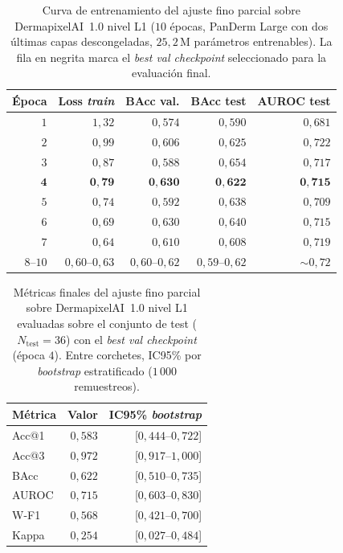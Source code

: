 \begin{table}[H]
\centering
\footnotesize
\setlength{\tabcolsep}{4pt}
\renewcommand{\arraystretch}{0.95}
\caption{Curva de entrenamiento del ajuste fino parcial sobre
DermapixelAI~1.0 nivel L1 ($10$ épocas, PanDerm Large con dos
últimas capas descongeladas, $25{,}2$\,M parámetros
entrenables). La fila en negrita marca el \emph{best val
checkpoint} seleccionado para la evaluación final.}
\label{tab:dermapixel-ft-train}
\begin{tabular}{rrrrr}
\hline
Época & Loss \emph{train} & BAcc val. & BAcc test & AUROC test \\
\hline
$1$  & $1{,}32$ & $0{,}574$ & $0{,}590$ & $0{,}681$ \\
$2$  & $0{,}99$ & $0{,}606$ & $0{,}625$ & $0{,}722$ \\
$3$  & $0{,}87$ & $0{,}588$ & $0{,}654$ & $0{,}717$ \\
$\mathbf{4}$  & $\mathbf{0{,}79}$ & $\mathbf{0{,}630}$ & $\mathbf{0{,}622}$ & $\mathbf{0{,}715}$ \\
$5$  & $0{,}74$ & $0{,}592$ & $0{,}638$ & $0{,}709$ \\
$6$  & $0{,}69$ & $0{,}630$ & $0{,}640$ & $0{,}715$ \\
$7$  & $0{,}64$ & $0{,}610$ & $0{,}608$ & $0{,}719$ \\
$8$--$10$ & $0{,}60$--$0{,}63$ & $0{,}60$--$0{,}62$ & $0{,}59$--$0{,}62$ & $\sim 0{,}72$ \\
\hline
\end{tabular}
\end{table}

\begin{table}[H]
\centering
\footnotesize
\setlength{\tabcolsep}{4pt}
\renewcommand{\arraystretch}{0.95}
\caption{Métricas finales del ajuste fino parcial sobre
DermapixelAI~1.0 nivel L1 evaluadas sobre el conjunto de test
($N_{\mathrm{test}} = 36$) con el \emph{best val checkpoint}
(época $4$). Entre corchetes, IC95\% por \emph{bootstrap}
estratificado ($1\,000$ remuestreos).}
\label{tab:dermapixel-ft-final}
\begin{tabular}{lrr}
\hline
Métrica   & Valor      & IC95\% \emph{bootstrap} \\
\hline
Acc@1     & $0{,}583$  & [$0{,}444$--$0{,}722$] \\
Acc@3     & $0{,}972$  & [$0{,}917$--$1{,}000$] \\
BAcc      & $0{,}622$  & [$0{,}510$--$0{,}735$] \\
AUROC     & $0{,}715$  & [$0{,}603$--$0{,}830$] \\
W-F1      & $0{,}568$  & [$0{,}421$--$0{,}700$] \\
Kappa     & $0{,}254$  & [$0{,}027$--$0{,}484$] \\
\hline
\end{tabular}
\end{table}

